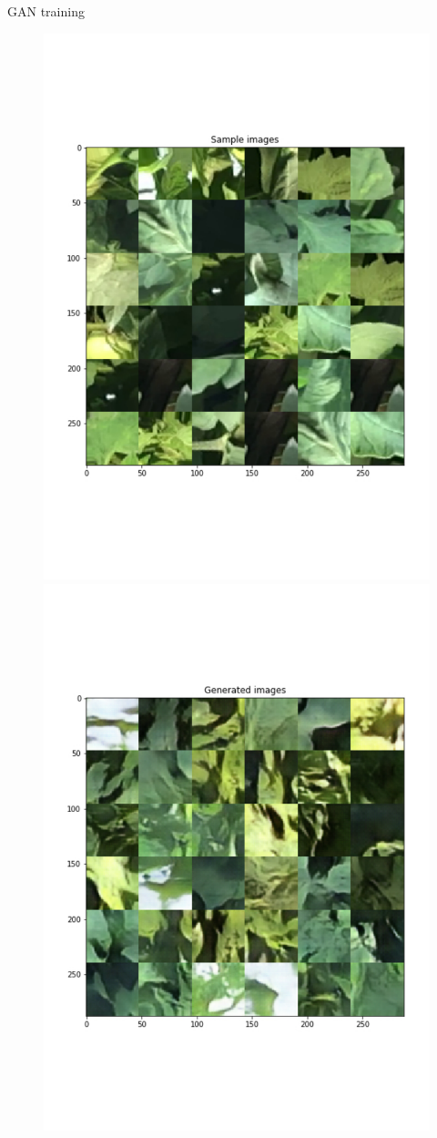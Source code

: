 \documentclass[15pt]{beamer} %
\begin{document}
\begin{frame}{GAN training}
 
 
\begin{figure}[H]
\centering
\begin{minipage}{.5\textwidth}
  \centering
  \includegraphics[width=.75\linewidth]{samples}
\end{minipage}%
\begin{minipage}{.5\textwidth}
  \centering
  \includegraphics[width=.75\linewidth]{generated_samples}
\end{minipage}
\end{figure}
 
 
\end{frame}
\end{document}
